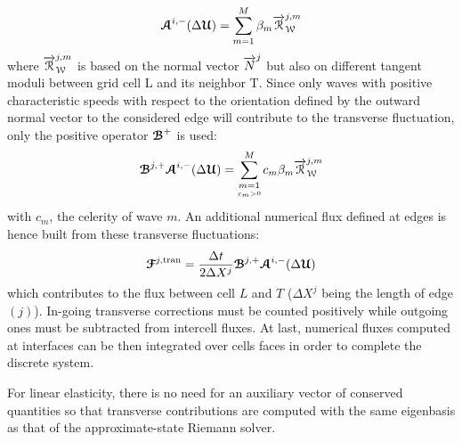 \begin{equation}
{\boldsymbol{\mathcal{A}}}^{i,-}(\Delta {\boldsymbol{\mathcal{U}}}) = \sum_{m=1}^{M} \beta_m {\overrightarrow{\mathcal{R}}}^{j,m}_{\mathcal{W}}
\end{equation}
where ${\overrightarrow{\mathcal{R}}}_{\mathcal{W}}^{j,m}$ is based on the normal vector ${\overrightarrow{N}}^j$ but also on different tangent moduli between grid cell L and its neighbor T.
Since only waves with positive characteristic speeds with respect to the orientation defined by the outward normal vector to the considered edge will contribute to the transverse fluctuation, only the positive operator ${\boldsymbol{\mathcal{B}}}^+$ is used:
\begin{equation}
{\boldsymbol{\mathcal{B}}}^{j,+} {\boldsymbol{\mathcal{A}}}^{i,-}(\Delta {\boldsymbol{\mathcal{U}}}) = \sum_{\underset{c_m >0}{m=1}}^{M} c_m \beta_m {\overrightarrow{\mathcal{R}}}_{\mathcal{W}}^{j,m} \label{eq:transverse_fluctuations}
\end{equation}
with $c_m$, the celerity of wave $m$.
An additional numerical flux defined at edges is hence built from these transverse fluctuations:
\begin{equation}
{\boldsymbol{\mathcal{F}}}^{j,\text{tran}} = \frac{\Delta t}{2 \Delta X^j} {\boldsymbol{\mathcal{B}}}^{j,+} {\boldsymbol{\mathcal{A}}}^{i,-}(\Delta {\boldsymbol{\mathcal{U}}}) \label{eq:transverse_corrections}
\end{equation}
which contributes to the flux between cell $L$ and $T$ ($\Delta X^j$ being the length of edge $(j)$). 
In-going transverse corrections must be counted positively while outgoing ones must be subtracted from intercell fluxes. At last, numerical fluxes computed at interfaces can be then integrated over cells faces in order to complete the discrete system.%

 
\begin{remark} 
  For linear elasticity, there is no need for an auxiliary vector of conserved quantities so that transverse contributions are computed with the same eigenbasis as that of the approximate-state Riemann solver.
\end{remark}

